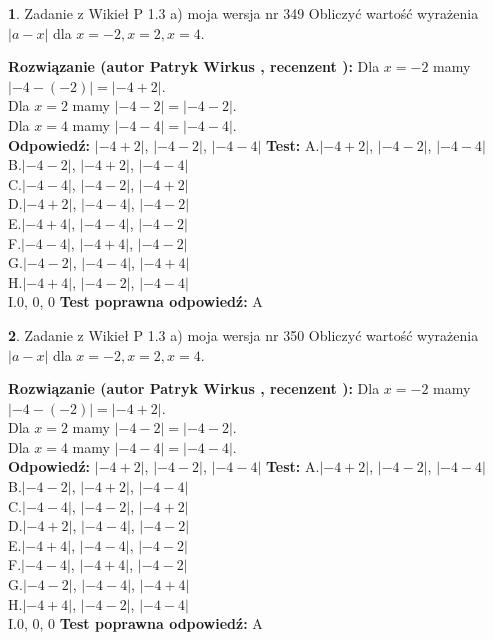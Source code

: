 \documentclass[12pt, a4paper]{article}
\theoremstyle{definition} %
\newtheorem{zad}{}
\newcommand{\zadStart}[1]{\begin{zad}#1\newline}
\newcommand{\zadStop}{\end{zad}}
\newcommand{\rozwStart}[2]{\noindent \textbf{Rozwiązanie (autor #1 , recenzent #2): }\newline}
\newcommand{\rozwStop}{\newline}
\newcommand{\odpStart}{\noindent \textbf{Odpowiedź:}\newline}
\newcommand{\odpStop}{\newline}
\newcommand{\testStart}{\noindent \textbf{Test:}\newline}
\newcommand{\testStop}{\newline}
\newcommand{\kluczStart}{\noindent \textbf{Test poprawna odpowiedź:}\newline}
\newcommand{\kluczStop}{\newline}
\begin{document}
\zadStart{Zadanie z Wikieł P 1.3 a) moja wersja nr 349}
Obliczyć wartość wyrażenia $|a - x|$ dla $x=-2,x=2,x=4$.
\zadStop
\rozwStart{Patryk Wirkus}{}
Dla $x = -2$ mamy $|-4 - (-2)| = |-4 + 2|$.\\
Dla $x = 2$ mamy $|-4 - 2| = |-4 - 2|$.\\
Dla $x = 4$ mamy $|-4 - 4| = |-4 - 4|$.\\
\rozwStop
\odpStart
$|-4 + 2|$, $|-4 - 2|$, $|-4 - 4|$
\odpStop
\testStart
A.$|-4 + 2|$, $|-4 - 2|$, $|-4 - 4|$\\
B.$|-4 - 2|$, $|-4 + 2|$, $|-4 - 4|$\\
C.$|-4 - 4|$, $|-4 - 2|$, $|-4 + 2|$\\
D.$|-4 + 2|$, $|-4 - 4|$, $|-4 - 2|$\\
E.$|-4 + 4|$, $|-4 - 4|$, $|-4 - 2|$\\
F.$|-4 - 4|$, $|-4 + 4|$, $|-4 - 2|$\\
G.$|-4 - 2|$, $|-4 - 4|$, $|-4 + 4|$\\
H.$|-4 + 4|$, $|-4 - 2|$, $|-4 - 4|$\\
I.$0$, $0$, $0$
\testStop
\kluczStart
A
\kluczStop



\zadStart{Zadanie z Wikieł P 1.3 a) moja wersja nr 350}
Obliczyć wartość wyrażenia $|a - x|$ dla $x=-2,x=2,x=4$.
\zadStop
\rozwStart{Patryk Wirkus}{}
Dla $x = -2$ mamy $|-4 - (-2)| = |-4 + 2|$.\\
Dla $x = 2$ mamy $|-4 - 2| = |-4 - 2|$.\\
Dla $x = 4$ mamy $|-4 - 4| = |-4 - 4|$.\\
\rozwStop
\odpStart
$|-4 + 2|$, $|-4 - 2|$, $|-4 - 4|$
\odpStop
\testStart
A.$|-4 + 2|$, $|-4 - 2|$, $|-4 - 4|$\\
B.$|-4 - 2|$, $|-4 + 2|$, $|-4 - 4|$\\
C.$|-4 - 4|$, $|-4 - 2|$, $|-4 + 2|$\\
D.$|-4 + 2|$, $|-4 - 4|$, $|-4 - 2|$\\
E.$|-4 + 4|$, $|-4 - 4|$, $|-4 - 2|$\\
F.$|-4 - 4|$, $|-4 + 4|$, $|-4 - 2|$\\
G.$|-4 - 2|$, $|-4 - 4|$, $|-4 + 4|$\\
H.$|-4 + 4|$, $|-4 - 2|$, $|-4 - 4|$\\
I.$0$, $0$, $0$
\testStop
\kluczStart
A
\kluczStop
\end{document}
